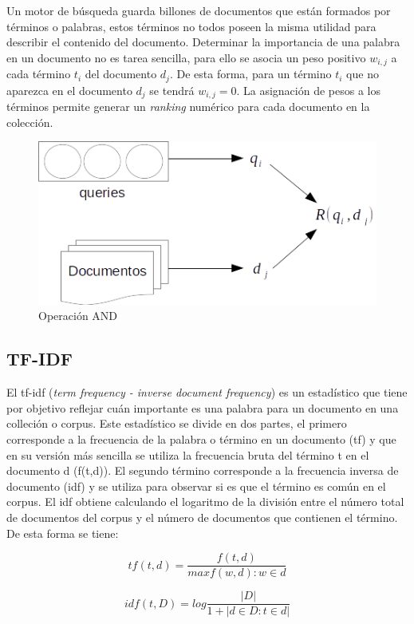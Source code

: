 Un motor de búsqueda guarda billones de documentos que están formados por términos o palabras, estos términos no todos poseen la misma utilidad para describir el contenido del documento. Determinar la importancia de una palabra en un documento no es tarea sencilla, para ello se asocia un peso positivo $w_{i,j}$ a cada término $t_{i}$ del documento $d_{j}$. De esta forma, para un término $t_{i}$ que no aparezca en el documento $d_{j}$ se tendrá $w_{i,j} = 0$. La asignación de pesos a los términos permite generar un \textit{ranking} numérico para cada documento en la colección.


\begin{figure}[tp]
\centering
\includegraphics[scale=.75]{images/ranking_process.png}
\caption{Operaci\'on AND}
\label{fig:ranking_process}
\end{figure}


\subsection{TF-IDF}
\label{marco:tfidf}
El tf-idf (\textit{term frequency - inverse document frequency}) es un estadístico que tiene por objetivo reflejar cuán importante es una palabra para un documento en una colleción o corpus. Este estadístico se divide en dos partes, el primero corresponde a la frecuencia de la palabra o término en un documento (tf) y que en su versión más sencilla se utiliza la frecuencia bruta del término t en el documento d (f(t,d)). El segundo término corresponde a la frecuencia inversa de documento (idf) y se utiliza para observar si es que el término es común en el corpus. El idf obtiene calculando el logaritmo de la división entre el número total de documentos del corpus y el número de documentos que contienen el término.
De esta forma se tiene:

$$tf(t,d) = \dfrac{f(t,d) }{ max{f(w,d) : w \in d}}$$

$$idf(t,D) = log \frac{ |D| }{1 + |{d \in D : t \in d}|} $$

